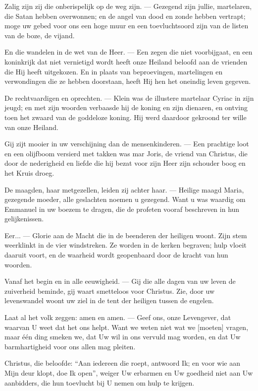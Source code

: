\documentclass[12pt,twoside,a5paper]{article}
\begin{document}
\begin{halfparskip}
  Zalig zijn zij die onberispelijk op de weg zijn. --- Gezegend zijn jullie, martelaren, die Satan hebben overwonnen; en de angel van dood en zonde hebben vertrapt; moge uw gebed voor ons een hoge muur en een toevluchtsoord zijn van de listen van de boze, de vijand.

  En die wandelen in de wet van de Heer. --- Een zegen die niet voorbijgaat, en een koninkrijk dat niet vernietigd wordt heeft onze Heiland beloofd aan de vrienden die Hij heeft uitgekozen. En in plaats van beproevingen, martelingen en verwondingen die ze hebben doorstaan, heeft Hij hen het oneindig leven gegeven.

  De rechtvaardigen en oprechten. --- Klein was de illustere martelaar Cyriac in zijn jeugd; en met zijn woorden verbaasde hij de koning en zijn dienaren, en ontving toen het zwaard van de goddeloze koning. Hij werd daardoor gekroond ter wille van onze Heiland.

  Gij zijt mooier in uw verschijning dan de mensenkinderen. --- Een prachtige loot en een olijfboom versierd met takken was mar Joris, de vriend van Christus, die door de nederigheid en liefde die hij bezat voor zijn Heer zijn schouder boog en het Kruis droeg.

  De maagden, haar metgezellen, leiden zij achter haar. --- Heilige maagd Maria, gezegende moeder, alle geslachten noemen u gezegend. Want u was waardig om Emmanuel in uw boezem te dragen, die de profeten vooraf beschreven in hun gelijkenissen.

  Eer... --- Glorie aan de Macht die in de beenderen der heiligen woont. Zijn stem weerklinkt in de vier windstreken. Ze worden in de kerken begraven; hulp vloeit daaruit voort, en de waarheid wordt geopenbaard door de kracht van hun woorden.

  Vanaf het begin en in alle eeuwigheid. --- Gij die alle dagen van uw leven de zuiverheid beminde, gij waart smetteloos voor Christus. Zie, door uw levenswandel woont uw ziel in de tent der heiligen tussen de engelen.

  Laat al het volk zeggen: amen en amen. --- Geef ons, onze Levengever, dat waarvan U weet dat het ons helpt. Want we weten niet wat we [moeten] vragen, maar één ding smeken we, dat Uw wil in ons vervuld mag worden, en dat Uw barmhartigheid voor ons allen mag pleiten.

  Christus, die beloofde: ``Aan iedereen die roept, antwoord Ik; en voor wie aan Mijn deur klopt, doe Ik open'', weiger Uw erbarmen en Uw goedheid niet aan Uw aanbidders, die hun toevlucht bij U nemen om hulp te krijgen.
\end{halfparskip}
\end{document}
